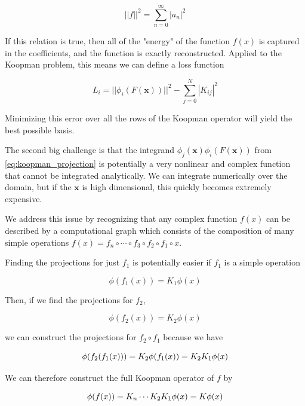 \documentclass[12pt, letterpaper]{article}
\begin{document}
\begin{equation}
    ||f||^2 = \overset{\infty}{\underset{n = 0}{\sum}} |a_n|^2
\end{equation}

If this relation is true, then all of the "energy" of the function $f(x)$ is captured in the coefficients, and the function is exactly reconstructed.  Applied to the Koopman problem, this means we can define a loss function

\begin{equation}
    L_i = ||\phi_i(F(\mathbf{x}))||^2 - \overset{N}{\underset{j = 0}{\sum}} |K_{ij}|^2
\end{equation}

Minimizing this error over all the rows of the Koopman operator will yield the best possible basis.

The second big challenge is that the integrand $\phi_j(\mathbf{x}) \phi_i(F(\mathbf{x}))$ from \ref{eq:koopman_projection} is potentially a very nonlinear and complex function that cannot be integrated analytically.  We can integrate numerically over the domain, but if the $\mathbf{x}$ is high dimensional, this quickly becomes extremely expensive.

We address this issue by recognizing that any complex function $f(x)$ can be described by a computational graph which consists of the composition of many simple operations $f(x) = f_n \circ \cdots \circ f_3 \circ f_2 \circ f_1 \circ x$.  

Finding the projections for just $f_1$ is potentially easier if $f_1$ is a simple operation

\begin{equation}
    \phi(f_1(x)) = K_1 \phi(x)
\end{equation}

Then, if we find the projections for $f_2$, 

\begin{equation}
    \phi(f_2(x)) = K_2 \phi(x)
\end{equation}

we can construct the projections for $f_2 \circ f_1$ because we have

\begin{equation}
    \phi(f_2(f_1(x))) = K_2 \phi(f_1(x)) = K_2 K_1 \phi(x)\\ 
\end{equation}

We can therefore construct the full Koopman operator of $f$ by

\begin{equation}
    \phi(f(x)) = K_n \cdots K_2 K_1 \phi(x) = K \phi(x)\\ 
\end{equation}
\end{document}
